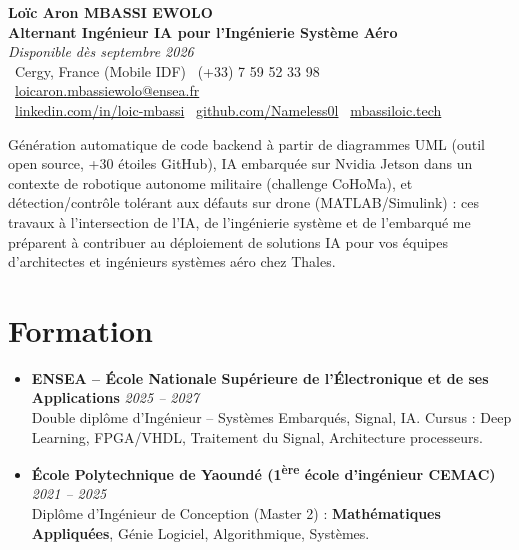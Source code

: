 \documentclass[a4paper,11pt]{article}
\begin{document}
\begin{center}
    {\Large \textbf{Loïc Aron MBASSI EWOLO}} \\ \vspace{4pt}
    \textbf{\large Alternant Ingénieur IA pour l'Ingénierie Système Aéro} \\
    \textit{\small Disponible dès septembre 2026} \\ \vspace{4pt}
    \small
    \faMapMarker\ Cergy, France (Mobile IDF) \quad
    \faPhone\ (+33) 7 59 52 33 98 \quad
    \faEnvelope\ \href{mailto:loicaron.mbassiewolo@ensea.fr}{loicaron.mbassiewolo@ensea.fr} \\ \vspace{2pt}
    \faLinkedin\ \href{https://www.linkedin.com/in/loic-mbassi/}{linkedin.com/in/loic-mbassi} \quad
    \faGithub\ \href{https://github.com/Nameless0l}{github.com/Nameless0l} \quad
    \faGlobe\ \href{https://mbassiloic.tech}{mbassiloic.tech}
\end{center}

\vspace{-6pt}

\noindent\small{Génération automatique de code backend à partir de diagrammes UML (outil open source, +30 étoiles GitHub), IA embarquée sur Nvidia Jetson dans un contexte de robotique autonome militaire (challenge CoHoMa), et détection/contrôle tolérant aux défauts sur drone (MATLAB/Simulink) : ces travaux à l'intersection de l'IA, de l'ingénierie système et de l'embarqué me préparent à contribuer au déploiement de solutions IA pour vos équipes d'architectes et ingénieurs systèmes aéro chez Thales.}

\section{Formation}
\begin{itemize}[leftmargin=*, label=\tiny$\bullet$, nosep]
    \item \textbf{ENSEA -- École Nationale Supérieure de l'Électronique et de ses Applications} \hfill \textit{2025 -- 2027} \\
    \small{Double diplôme d'Ingénieur -- Systèmes Embarqués, Signal, IA. Cursus : Deep Learning, FPGA/VHDL, Traitement du Signal, Architecture processeurs.}
    \item \textbf{École Polytechnique de Yaoundé (1\textsuperscript{ère} école d'ingénieur CEMAC)} \hfill \textit{2021 -- 2025} \\
    \small{Diplôme d'Ingénieur de Conception (Master 2) : \textbf{Mathématiques Appliquées}, Génie Logiciel, Algorithmique, Systèmes.}
\end{itemize}
\end{document}
